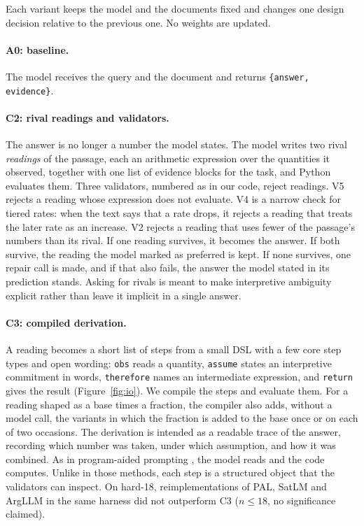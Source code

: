 \documentclass[11pt]{article}%
\begin{document}
Each variant keeps the model and the documents fixed and changes one design
decision relative to the previous one. No weights are updated.

\paragraph{\textsc{A0}: baseline.} The model receives the query and the
document and returns \texttt{\{answer, evidence\}}.

\paragraph{\textsc{C2}: rival readings and validators.} The answer is no
longer a number the model states. The model writes two rival \emph{readings} of the passage,
each an arithmetic expression over the quantities it observed, together with
one list of evidence blocks for the task, and Python evaluates them. Three
validators, numbered as in our code, reject readings. \textsc{V5} rejects a
reading whose expression does not evaluate. \textsc{V4} is a narrow check for
tiered rates: when the text says that a rate drops, it rejects a reading that
treats the later rate as an increase. \textsc{V2} rejects a reading that uses
fewer of the passage's numbers than its rival. If one reading survives, it
becomes the answer. If both survive, the reading the model marked as preferred
is kept. If none survives, one repair call is made, and if that also fails,
the answer the model stated in its prediction stands. Asking for rivals is
meant to make interpretive ambiguity explicit rather than leave it implicit in
a single answer.

\paragraph{\textsc{C3}: compiled derivation.} A reading becomes a short list of
steps from a small DSL with a few core step types and open wording:
\texttt{obs} reads a quantity,
\texttt{assume} states an interpretive commitment in words, \texttt{therefore}
names an intermediate expression, and \texttt{return} gives the result
(Figure~\ref{fig:io}). We compile the steps and evaluate them. For a reading
shaped as a base times a fraction, the compiler also adds, without a model
call, the variants in which the fraction is added to the base once or on each
of two occasions. The derivation
is intended as a readable trace of the answer, recording which number was
taken, under which assumption, and how it was combined. As in program-aided
prompting \citep{gao2023pal,chen2023pot}, the model reads and the code
computes. Unlike in those methods, each step is a structured object that the
validators can inspect. On hard-18, reimplementations of PAL, SatLM
\citep{ye2023satlm} and ArgLLM \citep{freedman2025argllm} in the same harness
did not outperform \textsc{C3}
($n\leq18$, no significance claimed).
\end{document}
